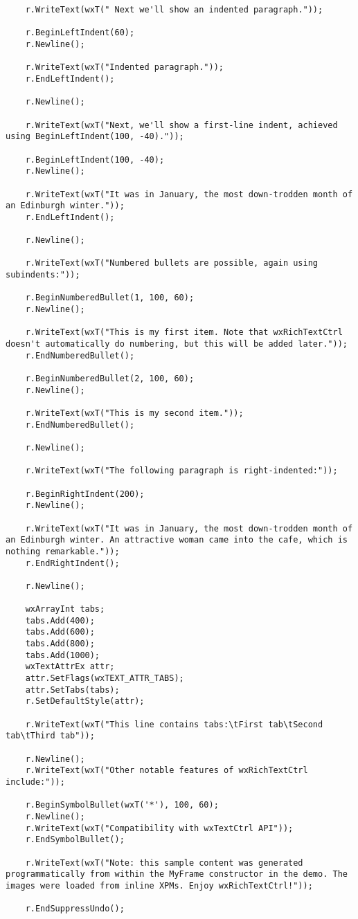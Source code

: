 {\begin{verbatim}
    r.WriteText(wxT(" Next we'll show an indented paragraph."));

    r.BeginLeftIndent(60);
    r.Newline();

    r.WriteText(wxT("Indented paragraph."));
    r.EndLeftIndent();

    r.Newline();

    r.WriteText(wxT("Next, we'll show a first-line indent, achieved using BeginLeftIndent(100, -40)."));

    r.BeginLeftIndent(100, -40);
    r.Newline();

    r.WriteText(wxT("It was in January, the most down-trodden month of an Edinburgh winter."));
    r.EndLeftIndent();

    r.Newline();

    r.WriteText(wxT("Numbered bullets are possible, again using subindents:"));

    r.BeginNumberedBullet(1, 100, 60);
    r.Newline();

    r.WriteText(wxT("This is my first item. Note that wxRichTextCtrl doesn't automatically do numbering, but this will be added later."));
    r.EndNumberedBullet();

    r.BeginNumberedBullet(2, 100, 60);
    r.Newline();

    r.WriteText(wxT("This is my second item."));
    r.EndNumberedBullet();

    r.Newline();

    r.WriteText(wxT("The following paragraph is right-indented:"));

    r.BeginRightIndent(200);
    r.Newline();

    r.WriteText(wxT("It was in January, the most down-trodden month of an Edinburgh winter. An attractive woman came into the cafe, which is nothing remarkable."));
    r.EndRightIndent();

    r.Newline();

    wxArrayInt tabs;
    tabs.Add(400);
    tabs.Add(600);
    tabs.Add(800);
    tabs.Add(1000);
    wxTextAttrEx attr;
    attr.SetFlags(wxTEXT_ATTR_TABS);
    attr.SetTabs(tabs);
    r.SetDefaultStyle(attr);
    
    r.WriteText(wxT("This line contains tabs:\tFirst tab\tSecond tab\tThird tab"));

    r.Newline();
    r.WriteText(wxT("Other notable features of wxRichTextCtrl include:"));

    r.BeginSymbolBullet(wxT('*'), 100, 60);
    r.Newline();
    r.WriteText(wxT("Compatibility with wxTextCtrl API"));
    r.EndSymbolBullet();

    r.WriteText(wxT("Note: this sample content was generated programmatically from within the MyFrame constructor in the demo. The images were loaded from inline XPMs. Enjoy wxRichTextCtrl!"));

    r.EndSuppressUndo();
\end{verbatim}
}

